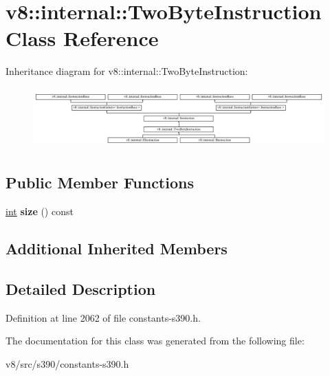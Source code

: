\hypertarget{classv8_1_1internal_1_1TwoByteInstruction}{}\section{v8\+:\+:internal\+:\+:Two\+Byte\+Instruction Class Reference}
\label{classv8_1_1internal_1_1TwoByteInstruction}
Inheritance diagram for v8\+:\+:internal\+:\+:Two\+Byte\+Instruction\+:\begin{figure}[H]
\begin{center}
\leavevmode
\includegraphics[height=2.364865cm]{classv8_1_1internal_1_1TwoByteInstruction}
\end{center}
\end{figure}
\subsection*{Public Member Functions}
\begin{DoxyCompactItemize}
\item 
\mbox{\label{classv8_1_1internal_1_1TwoByteInstruction_a3db64631f280e1286ac1b72961b9e280}} 
\mbox{\hyperlink{classint}{int}} {\bfseries size} () const
\end{DoxyCompactItemize}
\subsection*{Additional Inherited Members}


\subsection{Detailed Description}


Definition at line 2062 of file constants-\/s390.\+h.



The documentation for this class was generated from the following file\+:\begin{DoxyCompactItemize}
\item 
v8/src/s390/constants-\/s390.\+h\end{DoxyCompactItemize}
